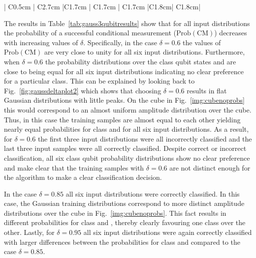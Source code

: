 \begin{table}[H]
\begin{tabular}{| C{0.5cm} | C{2.7cm} |C{1.7cm} | C{1.7cm} | C{1.7cm} |C{1.8cm}| C{1.8cm}|}
      \bottomrule
    \end{tabular}
    \caption{\label{tab:gauss3qubitresults} Amplitude-based kNN algorithm classification results after 1000 runs for various Gaussian distributions centered around six different three-qubit patterns. The Gaussian distributions were created using the coin gate $C(\delta)$. For each pattern three different distributions were prepared and classified by changing the parameter $\delta$: The results for $\delta = 0.6$ are always on top and marked with an empty circle ($\circ$), results for $\delta = 0.85$ are always in the middle marked with a filled circle ($\bullet$) and results for $\delta = 0.95$ are always at the bottom and marked with a triangle ($\triangleright$)}
\end{table}

The results in Table~\ref{tab:gauss3qubitresults} show that for all input distributions the probability of a successful conditional measurement ($\mathrm{Prob}(\mathrm{CM})$) decreases with increasing values of $\delta$. Specifically, in the case $\delta = 0.6$ the values of $\mathrm{Prob}(\mathrm{CM})$ are very close to unity for all six input distributions. Furthermore, when $\delta = 0.6$ the probability distributions over the class qubit states \0 and \1 are close to being equal for all six input distributions indicating no clear preference for a particular class. This can be explained by looking back to Fig.~\ref{fig:gaussdeltaplot2} which shows that choosing $\delta = 0.6$ results in flat Gaussian distributions with little peaks. On the cube in Fig.~\ref{img:cubenoprobs} this would correspond to an almost uniform amplitude distribution over the cube. Thus, in this case the training samples are almost equal to each other yielding nearly equal probabilities for class \0 and \1 for all six input distributions. As a result, for $\delta = 0.6$ the first three input distributions were all incorrectly classified and the last three input samples were all correctly classified. Despite correct or incorrect classification, all six class qubit probability distributions show no clear preference and make clear that the training samples with $\delta = 0.6$ are not distinct enough for the algorithm to make a clear classification decision.

In the case $\delta = 0.85$ all six input distributions were correctly classified. In this case, the Gaussian training distributions correspond to more distinct amplitude distributions over the cube in Fig.~\ref{img:cubenoprobs}. This fact results in different probabilities for class \0 and \1, thereby clearly favouring one class over the other. Lastly, for $\delta = 0.95$ all six input distributions were again correctly classified with larger differences between the probabilities for class \0 and \1 compared to the case $\delta = 0.85$.


